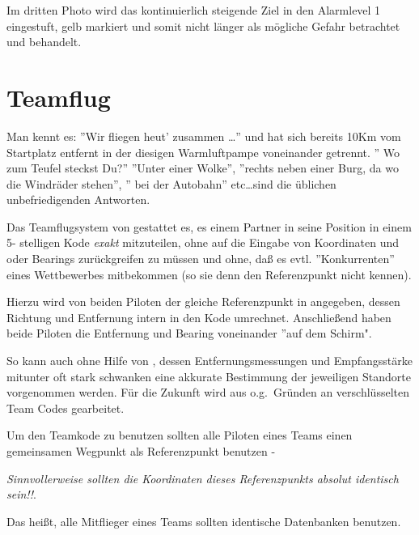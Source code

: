 Im dritten Photo wird das kontinuierlich steigende Ziel in den Alarmlevel 1
eingestuft, gelb markiert und somit nicht länger als mögliche Gefahr
betrachtet und behandelt.


\section{Teamflug}

Man kennt es: ''Wir fliegen heut' zusammen \dots'' und hat sich bereits 10Km vom
Startplatz entfernt in der diesigen Warmluftpampe voneinander getrennt. '' Wo zum Teufel steckst Du?''
''Unter einer Wolke'', ''rechts neben einer Burg, da wo die Windräder stehen'', '' bei der Autobahn'' etc\dots sind die üblichen
unbefriedigenden Antworten.


Das Teamflugsystem von \xc gestattet es, es einem Partner in \xc seine Position
  in einem 5- stelligen Kode \textsl{exakt} mitzuteilen, ohne auf die Eingabe von Koordinaten und
  oder Bearings zurückgreifen zu müssen und ohne, daß es evtl. ''Konkurrenten'' eines Wettbewerbes mitbekommen
  (so sie denn den Referenzpunkt nicht kennen).

  Hierzu wird von beiden Piloten der gleiche  Referenzpunkt in \xc angegeben,
  dessen Richtung und Entfernung \xc intern in den Kode umrechnet.
  Anschließend haben beide Piloten die Entfernung und Bearing voneinander ''auf dem Schirm".

So kann  auch ohne Hilfe von  \fl, dessen Entfernungsmessungen und Empfangsstärke
mitunter oft stark schwanken  eine akkurate Bestimmung der jeweiligen Standorte vorgenommen werden.
Für die Zukunft wird aus o.g.\ Gründen an verschlüsselten Team Codes gearbeitet.

Um den Teamkode zu benutzen sollten alle Piloten eines Teams einen gemeinsamen Wegpunkt als Referenzpunkt
benutzen - 

\textsl{Sinnvollerweise sollten die Koordinaten  dieses Referenzpunkts absolut identisch sein!!}.


Das heißt, alle Mitflieger eines Teams sollten identische Datenbanken benutzen.


